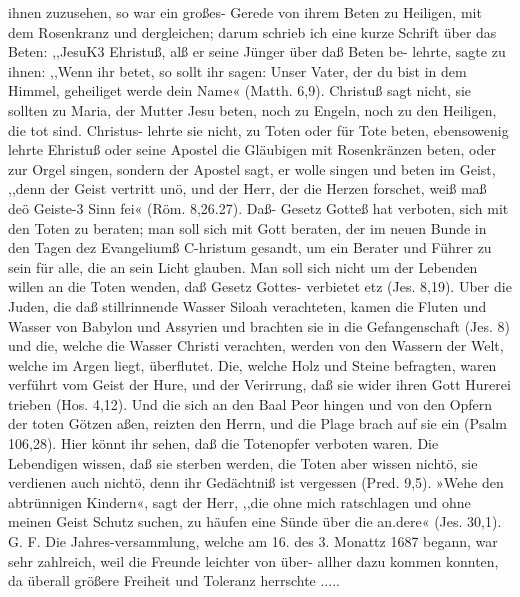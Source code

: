 ihnen zuzusehen, so war ein großes- Gerede von ihrem Beten zu
Heiligen, mit dem Rosenkranz und dergleichen; darum schrieb ich
eine kurze Schrift über das Beten:
,,JesuK3 Ehristuß, alß er seine Jünger über daß Beten be-
lehrte, sagte zu ihnen: ,,Wenn ihr betet, so sollt ihr sagen: Unser
Vater, der du bist in dem Himmel, geheiliget werde dein Name«
(Matth. 6,9). Christuß sagt nicht, sie sollten zu Maria, der
Mutter Jesu beten, noch zu Engeln, noch zu den Heiligen, die
tot sind. Christus- lehrte sie nicht, zu Toten oder für Tote
beten, ebensowenig lehrte Ehristuß oder seine Apostel die Gläubigen
mit Rosenkränzen beten, oder zur Orgel singen, sondern der
Apostel sagt, er wolle singen und beten im Geist, ,,denn der
Geist vertritt unö, und der Herr, der die Herzen forschet, weiß maß
deö Geiste-3 Sinn fei« (Röm. 8,26.27). Daß- Gesetz Gotteß hat
verboten, sich mit den Toten zu beraten; man soll sich mit Gott
beraten, der im neuen Bunde in den Tagen dez Evangeliumß
C-hristum gesandt, um ein Berater und Führer zu sein für alle,
die an sein Licht glauben. Man soll sich nicht um der Lebenden
willen an die Toten wenden, daß Gesetz Gottes- verbietet etz
(Jes. 8,19). Uber die Juden, die daß stillrinnende Wasser Siloah
verachteten, kamen die Fluten und Wasser von Babylon und
Assyrien und brachten sie in die Gefangenschaft (Jes. 8) und die,
welche die Wasser Christi verachten, werden von den Wassern
der Welt, welche im Argen liegt, überflutet. Die, welche Holz
und Steine befragten, waren verführt vom Geist der Hure, und
der Verirrung, daß sie wider ihren Gott Hurerei trieben (Hos. 4,12).
Und die sich an den Baal Peor hingen und von den Opfern der
toten Götzen aßen, reizten den Herrn, und die Plage brach
auf sie ein (Psalm 106,28). Hier könnt ihr sehen, daß die
Totenopfer verboten waren. Die Lebendigen wissen, daß sie
sterben werden, die Toten aber wissen nichtö, sie verdienen auch
nichtö, denn ihr Gedächtniß ist vergessen (Pred. 9,5). »Wehe den
abtrünnigen Kindern«, sagt der Herr, ,,die ohne mich ratschlagen
und ohne meinen Geist Schutz suchen, zu häufen eine Sünde über
die an.dere« (Jes. 30,1). G. F.
Die Jahres-versammlung, welche am 16. des 3. Monattz 1687
begann, war sehr zahlreich, weil die Freunde leichter von über-
allher dazu kommen konnten, da überall größere Freiheit und
Toleranz herrschte .....


